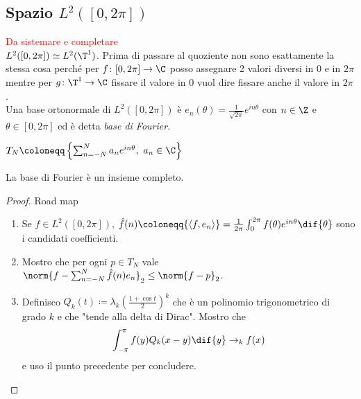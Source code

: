 \subsection{Spazio $ L^2([0, 2\pi]) $}
\textcolor{red}{Da sistemare e completare} \\
$ L^2([0, 2\pi]) \simeq L^2(\T^1) $. Prima di passare al quoziente non sono esattamente la stessa cosa perché per $ f \colon [0, 2\pi] \to \C $ posso assegnare 2 valori diversi in $ 0 $ e in $ 2\pi $ mentre per $ g \colon \T^1 \to \C $ fissare il valore in $ 0 $ vuol dire fissare anche il valore in $ 2\pi $. \\
Una base ortonormale di $ L^2([0, 2\pi]) $ è $ e_n(\theta) = \frac{1}{\sqrt{2\pi}}e^{i n \theta} $ con $ n \in \Z $ e $ \theta \in [0, 2\pi] $ ed è detta \emph{base di Fourier}. 
\begin{definition}
    $ T_N \coloneqq \left\{\sum_{n = -N}^{N} a_n e^{i n \theta}, \ a_n \in \C\right\} $
\end{definition}

\begin{thm}
    La base di Fourier è un insieme completo. 
\end{thm}
\begin{proof}
    Road map
    \begin{enumerate}
        \item Se $ f \in L^2([0, 2\pi]) $, $ \hat{f}(n) \coloneqq {\langle f, e_n \rangle} = \frac{1}{2\pi} \int_{0}^{2\pi} f(\theta) e^{i n\theta} \dif{\theta} $ sono i candidati coefficienti.
        \item Mostro che per ogni $ p \in T_N $ vale $ \norm{f - \sum_{n = -N}^{N} \hat{f}(n) e_n}_2 \leq \norm{f - p}_2 $.
        \item Definisco $ Q_k(t) \coloneqq \lambda_k (\frac{1 + \cos{t}}{2})^k $ che è un polinomio trigonometrico di grado $ k $ e che "tende alla delta di Dirac". Mostro che 
        \[
            \int_{-\pi}^{\pi} f(y) Q_k(x - y) \dif{y} \to_k f(x)
        \]
        e uso il punto precedente per concludere. 
    \end{enumerate}
\end{proof}